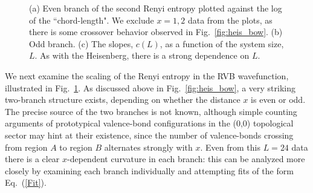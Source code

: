 \documentclass[prl,aps,twocolumn,floatfix,amsmath,amssymb,superscriptaddress,tightenlines]{revtex4}
\begin{document}

 \begin{figure}
   \begin{center}
   \end{center}
   \caption{(a) Even branch of the second Renyi entropy plotted against the log of the ``chord-length". We exclude $x=1,2$ data from the plots, as there is some crossover behavior observed in Fig.~\ref{fig:heis_bow}. (b) Odd branch. (c) The slopes, $c(L)$, as a function of the system size, $L$. As with the Heisenberg, there is a strong dependence on $L$.}
   \label{fig:2}
 \end{figure}

We next examine the scaling of the Renyi entropy in the RVB wavefunction, illustrated in Fig.~{\ref{fig:2}}.  
As discussed above in Fig.~\ref{fig:heis_bow}, a very striking two-branch structure exists, depending on whether the distance $x$ is even or odd.
The precise source of the two branches is not known, although simple counting arguments of prototypical valence-bond configurations in the (0,0) topological \cite{RVB1,RVB2} sector may hint at their existence, since the number of valence-bonds crossing from region $A$ to region $B$ alternates strongly with $x$.  Even from this $L=24$ data there is a clear $x$-dependent curvature in each branch: this can be analyzed more closely by examining each branch individually and attempting fits of the form Eq.~(\ref{Fit}).  
\end{document}
